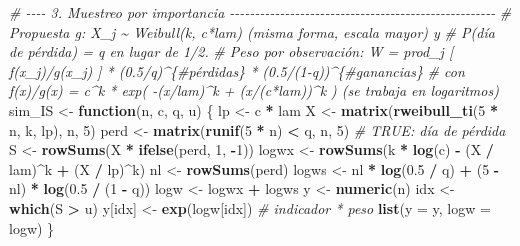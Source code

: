 \documentclass[
  spanish,
]{article}
\newenvironment{Shaded}{\begin{snugshade}}{\end{snugshade}}
\newcommand{\AttributeTok}[1]{\textcolor[rgb]{0.13,0.29,0.53}{#1}}
\newcommand{\CommentTok}[1]{\textcolor[rgb]{0.56,0.35,0.01}{\textit{#1}}}
\newcommand{\ControlFlowTok}[1]{\textcolor[rgb]{0.13,0.29,0.53}{\textbf{#1}}}
\newcommand{\DecValTok}[1]{\textcolor[rgb]{0.00,0.00,0.81}{#1}}
\newcommand{\FloatTok}[1]{\textcolor[rgb]{0.00,0.00,0.81}{#1}}
\newcommand{\FunctionTok}[1]{\textcolor[rgb]{0.13,0.29,0.53}{\textbf{#1}}}
\newcommand{\NormalTok}[1]{#1}
\newcommand{\OtherTok}[1]{\textcolor[rgb]{0.56,0.35,0.01}{#1}}
\newcommand{\SpecialCharTok}[1]{\textcolor[rgb]{0.81,0.36,0.00}{\textbf{#1}}}
\begin{document}
\begin{Shaded}
\begin{Highlighting}[]
\CommentTok{\# {-}{-}{-}{-} 3. Muestreo por importancia {-}{-}{-}{-}{-}{-}{-}{-}{-}{-}{-}{-}{-}{-}{-}{-}{-}{-}{-}{-}{-}{-}{-}{-}{-}{-}{-}{-}{-}{-}{-}{-}{-}{-}{-}{-}{-}{-}{-}{-}{-}{-}{-}{-}{-}{-}{-}{-}{-}{-}{-}{-}{-}}
\CommentTok{\# Propuesta g: X\_j \textasciitilde{} Weibull(k, c*lam) (misma forma, escala mayor) y}
\CommentTok{\#              P(día de pérdida) = q en lugar de 1/2.}
\CommentTok{\# Peso por observación: W = prod\_j [ f(x\_j)/g(x\_j) ] * (0.5/q)\^{}\{\#pérdidas\} * (0.5/(1{-}q))\^{}\{\#ganancias\}}
\CommentTok{\# con f(x)/g(x) = c\^{}k * exp( {-}(x/lam)\^{}k + (x/(c*lam))\^{}k )  (se trabaja en logaritmos)}
\NormalTok{sim\_IS }\OtherTok{\textless{}{-}} \ControlFlowTok{function}\NormalTok{(n, c, q, u) \{}
\NormalTok{  lp }\OtherTok{\textless{}{-}}\NormalTok{ c }\SpecialCharTok{*}\NormalTok{ lam}
\NormalTok{  X    }\OtherTok{\textless{}{-}} \FunctionTok{matrix}\NormalTok{(}\FunctionTok{rweibull\_ti}\NormalTok{(}\DecValTok{5} \SpecialCharTok{*}\NormalTok{ n, k, lp), n, }\DecValTok{5}\NormalTok{)}
\NormalTok{  perd }\OtherTok{\textless{}{-}} \FunctionTok{matrix}\NormalTok{(}\FunctionTok{runif}\NormalTok{(}\DecValTok{5} \SpecialCharTok{*}\NormalTok{ n) }\SpecialCharTok{\textless{}}\NormalTok{ q, n, }\DecValTok{5}\NormalTok{)                  }\CommentTok{\# TRUE: día de pérdida}
\NormalTok{  S    }\OtherTok{\textless{}{-}} \FunctionTok{rowSums}\NormalTok{(X }\SpecialCharTok{*} \FunctionTok{ifelse}\NormalTok{(perd, }\DecValTok{1}\NormalTok{, }\SpecialCharTok{{-}}\DecValTok{1}\NormalTok{))}
\NormalTok{  logwx }\OtherTok{\textless{}{-}} \FunctionTok{rowSums}\NormalTok{(k }\SpecialCharTok{*} \FunctionTok{log}\NormalTok{(c) }\SpecialCharTok{{-}}\NormalTok{ (X }\SpecialCharTok{/}\NormalTok{ lam)}\SpecialCharTok{\^{}}\NormalTok{k }\SpecialCharTok{+}\NormalTok{ (X }\SpecialCharTok{/}\NormalTok{ lp)}\SpecialCharTok{\^{}}\NormalTok{k)}
\NormalTok{  nl    }\OtherTok{\textless{}{-}} \FunctionTok{rowSums}\NormalTok{(perd)}
\NormalTok{  logws }\OtherTok{\textless{}{-}}\NormalTok{ nl }\SpecialCharTok{*} \FunctionTok{log}\NormalTok{(}\FloatTok{0.5} \SpecialCharTok{/}\NormalTok{ q) }\SpecialCharTok{+}\NormalTok{ (}\DecValTok{5} \SpecialCharTok{{-}}\NormalTok{ nl) }\SpecialCharTok{*} \FunctionTok{log}\NormalTok{(}\FloatTok{0.5} \SpecialCharTok{/}\NormalTok{ (}\DecValTok{1} \SpecialCharTok{{-}}\NormalTok{ q))}
\NormalTok{  logw  }\OtherTok{\textless{}{-}}\NormalTok{ logwx }\SpecialCharTok{+}\NormalTok{ logws}
\NormalTok{  y }\OtherTok{\textless{}{-}} \FunctionTok{numeric}\NormalTok{(n)}
\NormalTok{  idx }\OtherTok{\textless{}{-}} \FunctionTok{which}\NormalTok{(S }\SpecialCharTok{\textgreater{}}\NormalTok{ u)}
\NormalTok{  y[idx] }\OtherTok{\textless{}{-}} \FunctionTok{exp}\NormalTok{(logw[idx])                                }\CommentTok{\# indicador * peso}
  \FunctionTok{list}\NormalTok{(}\AttributeTok{y =}\NormalTok{ y, }\AttributeTok{logw =}\NormalTok{ logw)}
\NormalTok{\}}


\end{Highlighting}
\end{Shaded}
\end{document}
